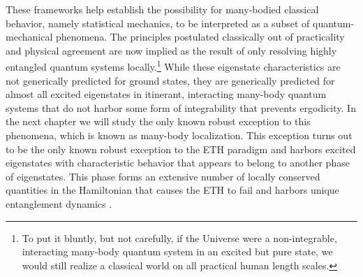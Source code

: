 These frameworks help establish the possibility for many-bodied classical behavior, namely statistical mechanics, to be interpreted as a subset of quantum-mechanical phenomena. The principles postulated classically out of practicality and physical agreement are now implied as the result of only resolving highly entangled quantum systems locally.\footnote{To put it bluntly, but not carefully, if the Universe were a non-integrable, interacting many-body quantum system in an excited but pure state, we would still realize a classical world on all practical human length scales.} While these eigenstate characteristics are not generically predicted for ground states, they are generically predicted for almost all excited eigenstates in itinerant, interacting many-body quantum systems that do not harbor some form of integrability that prevents ergodicity. In the next chapter we will study the only known robust exception to this phenomena, which is known as many-body localization\cite{Nandkishore2015,DAlessio2016}. This exception turns out to be the only known robust exception to the ETH paradigm and harbors excited eigenstates with characteristic behavior that appears to belong to another phase of eigenstates. This phase forms an extensive number of locally conserved quantities in the Hamiltonian that causes the ETH to fail and harbors unique entanglement dynamics \cite{Bardarson2012,Serbyn2013a,Serbyn2013b,Huse2014,Nandkishore2015}.